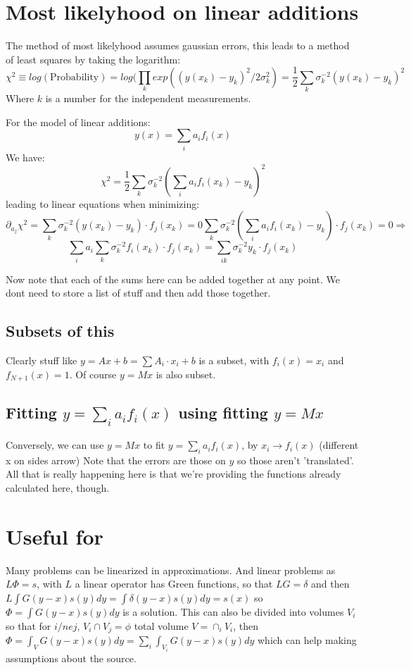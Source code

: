 \documentclass{article}
\author{Jasper den Ouden}
\newcommand{\half}{\frac{1}{2}}
\begin{document}
\section*{Most likelyhood on linear additions}
The method of most likelyhood assumes gaussian errors, this leads to a
 method of least squares by taking the logarithm:
$$\chi^2 \equiv log(\mathrm{Probability})= 
  log(\prod_kexp((y(x_k)-y_k)^2/2\sigma^2_k)=
  \half\sum_k\sigma_k^{-2}(y(x_k)-y_k)^2$$
Where $k$ is a number for the independent measurements.

For the model of linear additions:
$$y(x)= \sum_i a_if_i(x)$$
We have:
$$\chi^2=\half\sum_k\sigma_k^{-2}(\sum_{i}a_if_i(x_k)-y_k)^2$$
leading to linear equations when minimizing:
$$\partial_{a_j}\chi^2= \sum_k\sigma_k^{-2}(y(x_k)-y_k)\cdot f_j(x_k)=0
\sum_k\sigma_k^{-2}(\sum_ia_if_i(x_k)-y_k)\cdot f_j(x_k)=0
 \Rightarrow$$
$$\sum_i a_i \sum_k\sigma_k^{-2}f_i(x_k)\cdot f_j(x_k)=
   \sum_{ik}\sigma_k^{-2}y_k\cdot f_j(x_k)$$

Now note that each of the sums here can be added together at any point. We 
dont need to store a list of stuff and then add those together.

\subsection*{Subsets of this}
Clearly stuff like $y=Ax+b = \sum A_i\cdot x_i + b$ is a subset, with
$f_i(x)=x_i$ and $f_{N+1}(x)=1$. Of course $y=Mx$ is also  subset.

\subsection*{Fitting $y=\sum_ia_if_i(x)$ using fitting $y=Mx$}
Conversely, we can use $y=Mx$ to fit $y=\sum_ia_if_i(x)$, by 
$x_i\rightarrow f_i(x)$ (different x on sides arrow) Note that the errors are
those on $y$ so those aren't 'translated'. All that is really happening here 
is that we're providing the functions already calculated here, though.

\section*{Useful for}
Many problems can be linearized in approximations. And linear problems
as $L\Phi=s$, with $L$ a linear operator has Green functions, so that
$LG=\delta$ and then
 $L\int G(y-x)s(y) dy = \int \delta(y-x) s(y) dy= s(x)$ so 
$\Phi=\int G(y-x)s(y)dy$ is a solution. This can also be divided into volumes
$V_i$ so that for $i/ne j$, $V_i\cap V_j= \phi$ total volume $V=\cap_iV_i$,
then $\Phi= \int_V G(y-x)s(y)dy = \sum_i \int_{V_i}G(y-x)s(y)dy$ which can
help making assumptions about the source.
\end{document}
